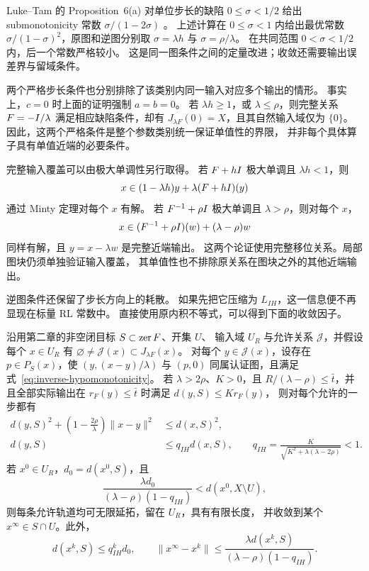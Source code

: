 \begin{remark}
\label{rem:hypo-coverage}
Luke--Tam 的 Proposition~6(a) 对单位步长的缺陷
$0\le\sigma<1/2$ 给出 submonotonicity 常数
$\sigma/(1-2\sigma)$
\cite{LukeTam2025GeneralizedMonotonicity}。
上述计算在 $0\le\sigma<1$ 内给出最优常数
$\sigma/(1-\sigma)^2$，原图和逆图分别取
$\sigma=\lambda h$ 与 $\sigma=\rho/\lambda$。
在共同范围 $0<\sigma<1/2$ 内，后一个常数严格较小。
这是同一图条件之间的定量改进；收敛还需要输出误差界与留域条件。

两个严格步长条件也分别排除了该类别内同一输入对应多个输出的情形。
事实上，$c=0$ 时上面的证明强制 $a=b=0$。
若 $\lambda h\ge1$，或 $\lambda\le\rho$，则完整关系
$F=-I/\lambda$ 满足相应缺陷条件，却有
$J_{\lambda F}(0)=X$，且其自然输入域仅为 $\{0\}$。
因此，这两个严格条件是整个参数类别统一保证单值性的界限，
并非每个具体算子具有单值近端的必要条件。

完整输入覆盖可以由极大单调性另行取得。
若 $F+hI$ 极大单调且 $\lambda h<1$，则
\[
 x\in(1-\lambda h)y+\lambda(F+hI)(y)
\]
通过 Minty 定理对每个 $x$ 有解。
若 $F^{-1}+\rho I$ 极大单调且 $\lambda>\rho$，则对每个 $x$，
\[
 x\in(F^{-1}+\rho I)(w)+(\lambda-\rho)w
\]
同样有解，且 $y=x-\lambda w$ 是完整近端输出。
这两个论证使用完整移位关系。局部图块仍须单独验证输入覆盖，
其单值性也不排除原关系在图块之外的其他近端输出。
\end{remark}

逆图条件还保留了步长方向上的耗散。
如果先把它压缩为 $L_{IH}$，这一信息便不再显现在标量 RL 常数中。
直接使用原内积不等式，可以得到下面的收敛因子。

\begin{corollary}[逆图条件下的能量收缩]
\label{cor:inverse-hypo-energy}
沿用第二章的非空闭目标 $S\subset\operatorname{zer} F$、开集 $U$、
输入域 $U_R$ 与允许关系 $\mathcal J$，并假设每个 $x\in U_R$ 有
$\varnothing\ne\mathcal J(x)\subset J_{\lambda F}(x)$。
对每个 $y\in\mathcal J(x)$，设存在 $p\in P_S(x)$，使
$(y,(x-y)/\lambda)$ 与 $(p,0)$ 同属认证图，且满足
式~\eqref{eq:inverse-hypomonotonicity}。
若 $\lambda>2\rho$、$K>0$，且
$R/(\lambda-\rho)\le\bar t$，并且全部实际输出在
$r_F(y)\le\bar t$ 时满足 $d(y,S)\le K r_F(y)$，
则对每个允许的一步都有
\begin{align}
 d(y,S)^2+\left(1-\frac{2\rho}{\lambda}\right)\|x-y\|^2
 &\le d(x,S)^2,\label{eq:inverse-hypo-energy}\\
 d(y,S)&\le q_{IH}d(x,S),\qquad
 q_{IH}=\frac{K}{\sqrt{K^2+\lambda(\lambda-2\rho)}}<1.
 \label{eq:inverse-hypo-rate}
\end{align}
若 $x^0\in U_R$，$d_0=d(x^0,S)$，且
\begin{equation}
 \frac{\lambda d_0}{(\lambda-\rho)(1-q_{IH})}
 <d(x^0,X\setminus U),
 \label{eq:inverse-hypo-budget}
\end{equation}
则每条允许轨道均可无限延拓，留在 $U_R$，具有有限长度，
并收敛到某个 $x^\infty\in S\cap U$。此外，
\[
 d(x^k,S)\le q_{IH}^k d_0,\qquad
 \|x^\infty-x^k\|
 \le\frac{\lambda d(x^k,S)}{(\lambda-\rho)(1-q_{IH})}.
\]
\end{corollary}

